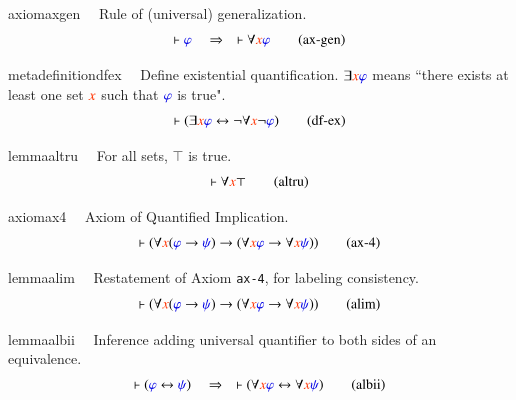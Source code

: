 \begin{restatable}{axiom}{axgen}~~ Rule of (universal) generalization.  
\begin{align}
\vdash \mw{\varphi}\quad\Rightarrow\quad \vdash \forall \msc{x}
    \mw{\varphi}\label{eq:ax-gen}\tag{ax-gen}
\end{align}
\end{restatable}

\begin{restatable}{metadefinition}{dfex}~~ Define existential quantification.
$\exists \msc{x} \mw{\varphi}$ means ``there exists at
     least one set $\msc{x}$ such that $\mw{\varphi}$ is true". 
\begin{align}
\vdash ( \exists \msc{x} \mw{\varphi} \leftrightarrow \lnot \forall \msc{x}
    \lnot \mw{\varphi} )\label{eq:df-ex}\tag{df-ex}
\end{align}
\end{restatable}

\begin{restatable}{lemma}{altru}~~ For all sets, $\top$ is true.  
\begin{align}
\vdash \forall \msc{x} \top\label{eq:altru}\tag{altru}
\end{align}
\end{restatable}

\begin{restatable}{axiom}{ax4}~~ Axiom of Quantified Implication.  
\begin{align}
\vdash ( \forall \msc{x} ( \mw{\varphi} \rightarrow \mw{\psi} ) \rightarrow (
    \forall \msc{x} \mw{\varphi} \rightarrow \forall \msc{x} \mw{\psi} )
    )\label{eq:ax-4}\tag{ax-4}
\end{align}
\end{restatable}

\begin{restatable}{lemma}{alim}~~ Restatement of Axiom {\tt ax-4}, for labeling
consistency.  
\begin{align}
\vdash ( \forall \msc{x} ( \mw{\varphi} \rightarrow \mw{\psi} ) \rightarrow (
    \forall \msc{x} \mw{\varphi} \rightarrow \forall \msc{x} \mw{\psi} )
    )\label{eq:alim}\tag{alim}
\end{align}
\end{restatable}

\begin{restatable}{lemma}{albii}~~ Inference adding universal quantifier to both
sides of an equivalence.
       ~
\begin{align}
\vdash ( \mw{\varphi} \leftrightarrow \mw{\psi} )\quad\Rightarrow\quad \vdash (
    \forall \msc{x} \mw{\varphi} \leftrightarrow \forall \msc{x} \mw{\psi}
    )\label{eq:albii}\tag{albii}
\end{align}
\end{restatable}

